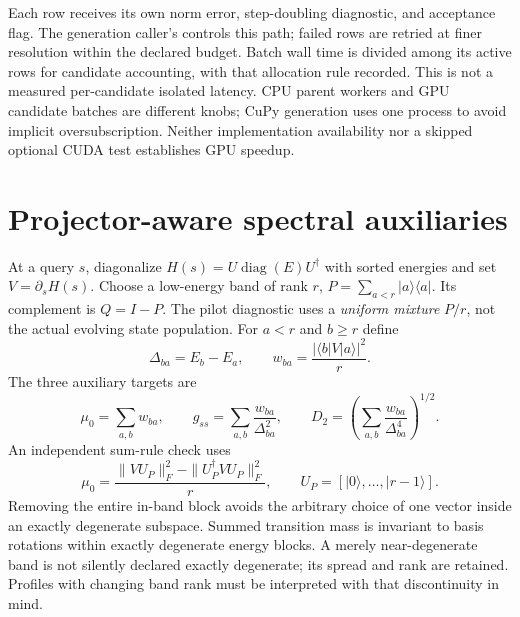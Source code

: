 \documentclass[10pt]{article}
\newcommand{\code}[1]{\texttt{\detokenize{#1}}}
\newcommand{\ket}[1]{\lvert #1\rangle}
\newcommand{\bra}[1]{\langle #1\rvert}
\begin{document}
Each row receives its own norm error, step-doubling diagnostic, and acceptance
flag. The generation caller's \code{candidate_batch_size} controls this path;
failed rows are retried at finer resolution within the declared budget. Batch
wall time is divided among its active rows for candidate accounting, with that
allocation rule recorded. This is not a measured per-candidate isolated latency.
CPU parent workers and GPU candidate batches are different knobs; CuPy generation
uses one process to avoid implicit oversubscription. Neither implementation
availability nor a skipped optional CUDA test establishes GPU speedup.

\newpage
\section{Projector-aware spectral auxiliaries}

At a query $s$, diagonalize $H(s)=U\operatorname{diag}(E)U^\dagger$ with sorted
energies and set $V=\partial_sH(s)$. Choose a low-energy band of rank $r$,
$P=\sum_{a<r}\ket a\bra a$. Its complement is $Q=I-P$. The pilot diagnostic
uses a \emph{uniform mixture} $P/r$, not the actual evolving state population.
For $a<r$ and $b\ge r$ define
\begin{equation}
 \Delta_{ba}=E_b-E_a,\qquad
 w_{ba}=\frac{|\bra bV\ket a|^2}{r}.
\end{equation}
The three auxiliary targets are
\begin{equation}
 \mu_0=\sum_{a,b}w_{ba},\qquad
 g_{ss}=\sum_{a,b}\frac{w_{ba}}{\Delta_{ba}^2},\qquad
 D_2=\left(\sum_{a,b}\frac{w_{ba}}{\Delta_{ba}^4}\right)^{1/2}.
 \label{eq:moments}
\end{equation}
An independent sum-rule check uses
\begin{equation}
 \mu_0=\frac{\|VU_P\|_F^2-\|U_P^\dagger VU_P\|_F^2}{r},
 \qquad U_P=[\ket0,\ldots,\ket{r-1}].
 \label{eq:sumrule}
\end{equation}
Removing the entire in-band block avoids the arbitrary choice of one vector
inside an exactly degenerate subspace. Summed transition mass is invariant to
basis rotations within exactly degenerate energy blocks. A merely
near-degenerate band is not silently declared exactly degenerate; its spread
and rank are retained. Profiles with changing band rank must be interpreted
with that discontinuity in mind.
\end{document}
